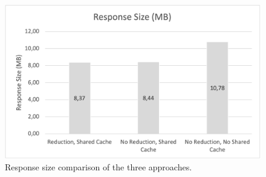 \ifshowImages
\begin{figure}[H]
\centering
\includegraphics[width=0.8\linewidth]{images/discussion/response-size.png}
\caption{Response size comparison of the three approaches.}\label{figure:discussion:response-size}
\end{figure}
\fi
